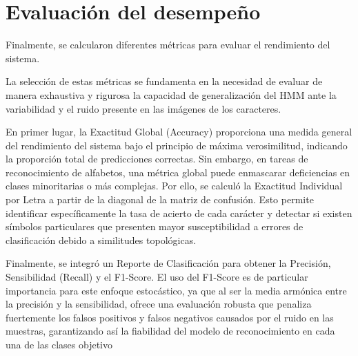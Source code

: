 \documentclass[
  spanish,
  us-letterpaper,
  DIV=11,
  numbers=noendperiod]{scrreprt}
\begin{document}
\section{Evaluación del desempeño}\label{sec-evaluacion}

Finalmente, se calcularon diferentes métricas para evaluar el
rendimiento del sistema.

La selección de estas métricas se fundamenta en la necesidad de evaluar
de manera exhaustiva y rigurosa la capacidad de generalización del HMM
ante la variabilidad y el ruido presente en las imágenes de los
caracteres.

En primer lugar, la Exactitud Global (Accuracy) proporciona una medida
general del rendimiento del sistema bajo el principio de máxima
verosimilitud, indicando la proporción total de predicciones correctas.
Sin embargo, en tareas de reconocimiento de alfabetos, una métrica
global puede enmascarar deficiencias en clases minoritarias o más
complejas. Por ello, se calculó la Exactitud Individual por Letra a
partir de la diagonal de la matriz de confusión. Esto permite
identificar específicamente la tasa de acierto de cada carácter y
detectar si existen símbolos particulares que presenten mayor
susceptibilidad a errores de clasificación debido a similitudes
topológicas.

Finalmente, se integró un Reporte de Clasificación para obtener la
Precisión, Sensibilidad (Recall) y el F1-Score. El uso del F1-Score es
de particular importancia para este enfoque estocástico, ya que al ser
la media armónica entre la precisión y la sensibilidad, ofrece una
evaluación robusta que penaliza fuertemente los falsos positivos y
falsos negativos causados por el ruido en las muestras, garantizando así
la fiabilidad del modelo de reconocimiento en cada una de las clases
objetivo
\end{document}
